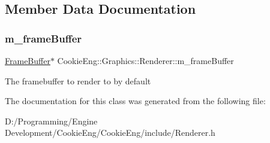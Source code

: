 \subsection{Member Data Documentation}
\mbox{\label{class_cookie_eng_1_1_graphics_1_1_renderer_a64f992d6d2476fe2ea641f31a46f006e}} 
\subsubsection{\texorpdfstring{m\+\_\+frame\+Buffer}{m\_frameBuffer}}
{\footnotesize\ttfamily \hyperlink{class_cookie_eng_1_1_graphics_1_1_frame_buffer}{Frame\+Buffer}$\ast$ Cookie\+Eng\+::\+Graphics\+::\+Renderer\+::m\+\_\+frame\+Buffer\hspace{0.3cm}{\ttfamily [protected]}}

The framebuffer to render to by default 

The documentation for this class was generated from the following file\+:\begin{DoxyCompactItemize}
\item 
D\+:/\+Programming/\+Engine Development/\+Cookie\+Eng/\+Cookie\+Eng/include/Renderer.\+h\end{DoxyCompactItemize}
